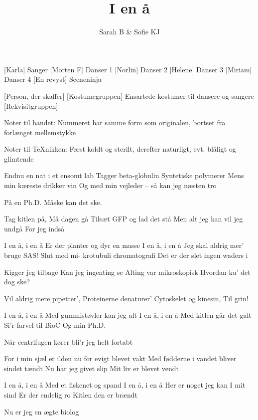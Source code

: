 \documentclass[a4paper,11pt]{article}
\title{I en å}
\author{Sarah B \& Sofie KJ}
\begin{document}
\maketitle

\begin{roles}
    [Karla] Sanger
    [Morten F] Danser 1
    [Norlin] Danser 2
    [Helene] Danser 3
    [Miriam] Danser 4
    [En revyst] Sceneninja
\end{roles}

\begin{props}
    [Person, der skaffer]
    [Kostumegruppen] Ensartede kostumer til dansere og sangere
    [Rekvisitgruppen]
\end{props}

\scene
Noter til bandet:
Nummeret har samme form som originalen, bortset fra forlænget mellemstykke

Noter til TeXnikken: Først koldt og sterilt, derefter naturligt, evt. blåligt og glimtende

\begin{song}
Endnu en nat i et ensomt lab
Tagger beta-globulin
Syntetiske polymerer
Mens min kæreste drikker vin
Og med min vejleder -- så kan jeg næsten tro

På en Ph.D.
Måske kan det ske.

Tag kitlen på, 
Må dagen gå
Tilsæt GFP og lad det stå
Men alt jeg kan vil jeg undgå
For jeg indså

I en å, i en å
Er der planter og dyr en masse
I en å, i en å
Jeg skal aldrig mer' bruge SAS!
Slut med mi-
krotubuli
chromatografi
Det er der slet ingen waders i

Kigger jeg tilbage
Kan jeg ingenting se
Alting var mikroskopisk
Hvordan ku' det dog ske?

Vil aldrig mere pipetter',
Proteinerne denaturer'
Cytoskelet og kinesin, 
Til grin!

I en å, i en å
Med gummistøvler kan jeg alt
I en å, i en å
Med kitlen går det galt
Si'r farvel
til BioC
Og min Ph.D.

Når centrifugen kører bli'r jeg helt fortabt

For i min sjæl er ilden nu for evigt blevet vakt
Med fødderne i vandet bliver sindet tændt
Nu har jeg givet slip
Mit liv er blevet vendt

I en å, i en å
Med et fiskenet og spand
I en å, i en å
Her er noget jeg kan
I mit sind
Er der endelig ro
Kitlen den er brændt

Nu er jeg en ægte biolog
\end{song}
\end{document}
